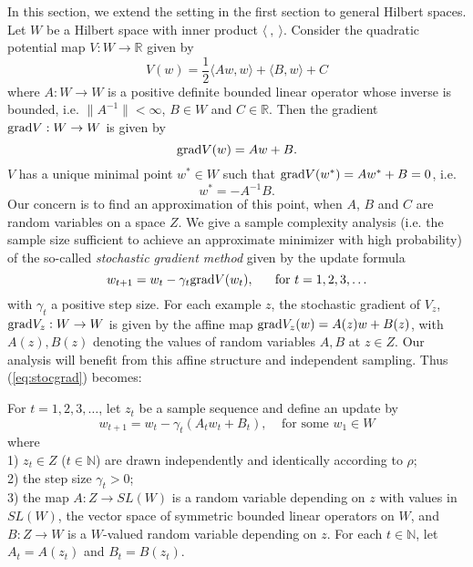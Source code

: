 \documentclass[twoside]{amsart}
\theoremstyle{theorem}
\theoremstyle{definition}
\theoremstyle{remark}
\def\N{{\mathbb N}}
\def\grad{{\rm grad}}
\def\R{{\mathbb R}}        %
\def\<{{\langle}}
\def\>{{\rangle}}
\begin{document}

In this section, we extend the setting in the first section to general Hilbert spaces.
Let $W$ be a Hilbert space with inner product $\<\ ,\ \>$. Consider the quadratic potential map $V: W\to \R$
given by
\begin{equation}
V(w) = \frac{1}{2} \langle A w, w \rangle + \<B,w\> + C
\end{equation}
where $A:W\to W$ is a positive definite bounded linear operator whose inverse is bounded, i.e. $\|A^{-1}\|<\infty$,
$B\in W$ and $C\in \R$. Then the gradient $\grad V: W\to W$ is given by
\[ \grad V(w)= Aw+B.  \]
$V$ has a unique minimal point $w^\ast\in W$ such that $\grad V(w^\ast)=Aw^\ast+B=0$, i.e.
\[ w^\ast = -A^{-1} B. \]
Our concern is to find an approximation of this point, when $A$, $B$ and $C$ are random variables
on a space $Z$. We give a sample complexity
analysis (i.e. the sample size sufficient to achieve an approximate minimizer with high probability)
of the so-called \emph{stochastic gradient method} given by the update formula
\begin{equation} \label{eq:stocgrad}
w_{t+1}= w_t - \gamma_t \grad V(w_t), \ \ \ \ \ \mbox{for $t=1,2,3,\ldots$}
\end{equation}
with $\gamma_t$ a positive step size. For each example $z$, the stochastic gradient of
$V_z$, $\grad V_z:W\to W$ is given by the affine map $\grad V_z(w) = A(z)
w + B(z)$, with $A(z), B(z)$ denoting the values of random
variables $A,B$ at $z\in Z$. Our analysis will benefit from this
affine structure and independent sampling. Thus (\ref{eq:stocgrad}) becomes:

\vspace{1pc}

For $t=1,2,3,\dots$, let $z_{t}$ be a sample sequence and define an update by
\begin{equation}\label{eq:wt}
w_{t+1} = w_t - \gamma_t (A_t w_t + B_t), \ \ \ \ \ \mbox{for some $w_1\in W$}
\end{equation}
where \\
1) $z_{t}\in Z$ ($t\in \N$) are drawn independently and identically according to $\rho$; \\
2) the step size $\gamma_t>0$; \\
3) the map $A: Z\to SL(W)$ is a random variable depending on $z$ with values in $SL(W)$, the vector space of symmetric bounded linear operators on $W$, and $B:Z\to W$ is a $W$-valued random variable
depending on $z$. For each $t\in \N$, let $A_t=A(z_t)$ and $B_t=B(z_t)$. \\
\end{document}
